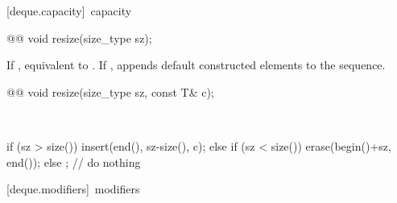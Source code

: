 \documentclass[american,twoside]{book}
\begin{document}
[deque.capacity]{\ capacity}

%
\begin{itemdecl}
@@
  void resize(size_type sz);
\end{itemdecl}

\begin{itemdescr}
\pnum
\effects If , equivalent to
. If ,
appends  default constructed elements to the
sequence.

\pnum
{}
\end{itemdescr}

%
\begin{itemdecl}
@@ 
  void resize(size_type sz, const T& c);
\end{itemdecl}

\begin{itemdescr}
\pnum
\effects\ 
\begin{codeblock}
if (sz > size())
  insert(end(), sz-size(), c);
else if (sz < size())
  erase(begin()+sz, end());
else
  ;                 // do nothing
\end{codeblock}

\pnum
{}
\end{itemdescr}

[deque.modifiers]{\ modifiers}
\end{document}
